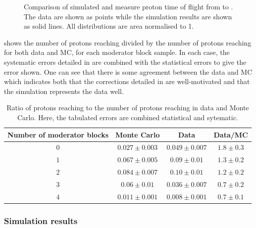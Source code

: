 \begin{figure}[h]
  \begin{adjustbox}{max totalsize=.65\textwidth, center}
    
  \end{adjustbox}
  \caption[Comparison of simulated and measure proton time of flight from \STwo to \SFour]{Comparison of simulated and measure proton time of flight from \STwo to \SFour. The data are shown as points while the simulation results are shown as solid lines. All distributions are area normalised to 1.}
  \label{fig:tofS4Sim}
\end{figure}

 shows the number of protons reaching \SFour divided by the number of protons reaching \SThree for both data and MC, for each moderator block sample.
In each case, the systematic errors detailed in  are combined with the statistical errors to give the error shown.
One can see that there is some agreement between the data and MC which indicates both that the corrections detailed in  are well-motivated and that the simulation represents the data well.

\begin{table}
  \centering
  \caption[Comparison of number of protons reaching \SThree and \SFour in data and Monte Carlo]{Ratio of protons reaching \SFour to the number of protons reaching \SThree in data and Monte Carlo. Here, the tabulated errors are combined statistical and sytematic.}
  \begin{tabular}{c|c c c}
    \hline
    \hline
    Number of moderator blocks & Monte Carlo & Data & Data/MC\\
    \hline
    $0$ & $0.027 \pm 0.003$ & $0.049 \pm 0.007$ & $1.8 \pm 0.3$ \\
    $1$ & $0.067 \pm 0.005$ & $0.09 \pm 0.01$ & $1.3 \pm 0.2$ \\
    $2$ & $0.084 \pm 0.007$ & $0.10 \pm 0.01$ & $1.2 \pm 0.2$ \\
    $3$ & $0.06 \pm 0.01$ & $0.036 \pm 0.007$ & $0.7 \pm 0.2$ \\
    $4$ & $0.011 \pm 0.001$ & $0.008 \pm 0.001$ & $0.7 \pm 0.1$ \\
    \hline
  \end{tabular}
  \label{tab:s3s4Ratios}
\end{table}

\subsubsection{Simulation results}
\label{sec:hptpc_beam_flux:results:MCData:results}

